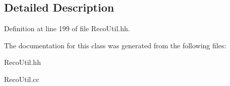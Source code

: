 \subsection{Detailed Description}


Definition at line 199 of file RecoUtil.hh.

The documentation for this class was generated from the following files:\begin{DoxyCompactItemize}
\item 
RecoUtil.hh\item 
RecoUtil.cc\end{DoxyCompactItemize}
